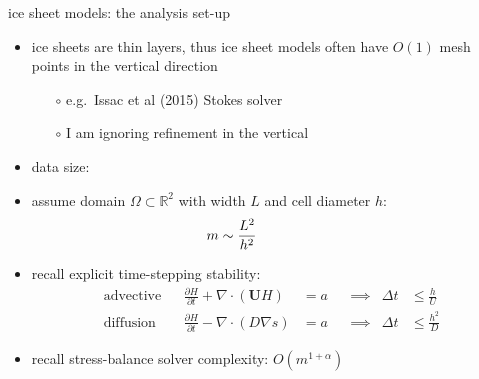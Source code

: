 \documentclass[svgnames,
               hyperref={colorlinks,citecolor=DeepPink4,linkcolor=FireBrick,urlcolor=Maroon},
               usepdftitle=false]  %
               {beamer}
\newcommand{\RR}{\mathbb{R}}
\newcommand{\grad}{\nabla}
\newcommand{\bU}{\mathbf{U}}
\begin{document}
\begin{frame}{ice sheet models: the analysis set-up}

\begin{itemize}
\item ice sheets are thin layers, thus ice sheet models often have $O(1)$ mesh points in the vertical direction
    \begin{itemize}
    \item[$\circ$] e.g.~Issac et al (2015) Stokes solver
    \item[$\circ$] I am ignoring refinement in the vertical
    \end{itemize}

\medskip
\item data size: 
\item assume domain $\Omega \subset \RR^2$ with width $L$ and cell diameter $h$:
  $$m \sim \frac{L^2}{h^2} \hspace{20mm}$$

\vspace{-14mm}
\hfill
{}

\vspace{-2mm}
\item recall explicit time-stepping stability:
{\footnotesize
\begin{align*}
\text{advective} && \frac{\partial H}{\partial t} + \nabla \cdot \left(\bU H\right) &= a & &\implies & \Delta t &\le \frac{h}{U} \\
\text{diffusion} && \frac{\partial H}{\partial t} - \nabla \cdot \left(D \grad s\right) &= a & &\implies & \Delta t &\le \frac{h^2}{D}
\end{align*}
}

\item recall stress-balance solver complexity: \quad $O(m^{1+\alpha})$
\end{itemize}
\end{frame}
\end{document}
